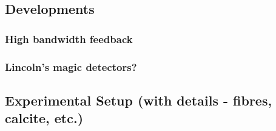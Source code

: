 \subsection{Developments}

\subsubsection{High bandwidth feedback}


\subsubsection{Lincoln's magic detectors?}

\subsection{Experimental Setup (with details - fibres, calcite, etc.)}


